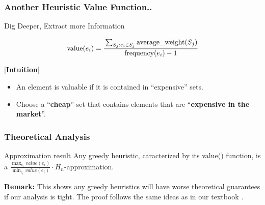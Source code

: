 \documentclass[xcolor=dvipsnames]{beamer}
\newlength\myheight
\newlength\mydepth
\newcommand*\inlinegraphics[1]{%
  \settototalheight\myheight{Xygp}%
  \settodepth\mydepth{Xygp}%
  \raisebox{-\mydepth}{\texttt{[image: \#1]}}%
}
\begin{document}
\begin{frame}
\frametitle{Another Heuristic Value Function..}
Dig Deeper, Extract more Information \inlinegraphics{excavators.eps}
\begin{minipage}{0.25\textwidth}
%
\end{minipage}%
\begin{minipage}{0.75\textwidth}
$$ \text{value}(e_i) = \cfrac{\sum_{S_j: e_i \in S_j} \text{average\_weight}(S_j)}{\text{frequency}(e_i)-1}$$
\end{minipage}
[\textbf{Intuition}]
\begin{itemize}
\item An element is valuable if it is contained in ``expensive'' sets.
\item Choose a ``\textbf{cheap}'' set that contains elements that are ``\textbf{expensive in the market}''.
\end{itemize}
\end{frame}

\begin{frame}
\frametitle{Theoretical Analysis}
\begin{block}{Approximation result}
Any greedy heuristic, caracterized by its value() function, is a $\displaystyle\frac{\displaystyle\max_{e_i} value(e_i)}{\displaystyle\min_{e_i} value(e_i)} \cdot H_n$-approximation.
\end{block}
\textbf{Remark:} This shows any greedy heuristics will have worse theoretical guarantees if our analysis is tight. The proof follows the same ideas as in our textbook \cite{Shmoys}.
\end{frame}
\end{document}
